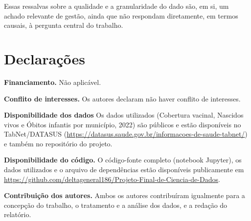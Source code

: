 \documentclass[pdflatex,sn-mathphys-num]{sn-jnl}
\begin{document}
Essas ressalvas sobre a qualidade e a granularidade do dado são, em si, um achado relevante de gestão, ainda que não respondam diretamente, em termos causais, à pergunta central do trabalho.

\section*{Declarações}

\textbf{Financiamento.} Não aplicável.

\noindent\textbf{Conflito de interesses.} Os autores declaram não haver conflito de interesses.

\noindent\textbf{Disponibilidade dos dados} Os dados utilizados (Cobertura vacinal, Nascidos vivos e Óbitos infantis por município, 2022) são públicos e estão disponíveis no TabNet/DATASUS (\url{https://datasus.saude.gov.br/informacoes-de-saude-tabnet/}) e também no repositório do projeto.

\noindent\textbf{Disponibilidade do código.} O código-fonte completo (notebook Jupyter), os dados utilizados e o arquivo de dependências estão disponíveis publicamente em \url{https://github.com/deltageneral186/Projeto-Final-de-Ciencia-de-Dados}.

\noindent\textbf{Contribuição dos autores.} Ambos os autores contribuíram igualmente para a concepção do trabalho, o tratamento e a análise dos dados, e a redação do relatório.
\end{document}
